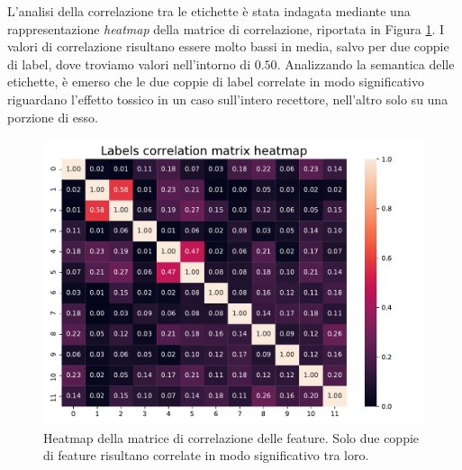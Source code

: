L'analisi della correlazione tra le etichette è stata indagata mediante una rappresentazione \textit{heatmap} della matrice di correlazione, riportata in Figura \ref{fig:labelscorrmatrixheatmap}. I valori di correlazione risultano essere molto bassi in media, salvo per due coppie di label, dove troviamo valori nell'intorno di $0.50$. Analizzando la semantica delle etichette, è emerso che le due coppie di label correlate in modo significativo riguardano l'effetto tossico in un caso sull'intero recettore, nell'altro solo su una porzione di esso.
\begin{figure}
	\centering
	\includegraphics[width=0.7\linewidth]{../images/pdf/labels_corr_matrix_heatmap}
	\caption{Heatmap della matrice di correlazione delle feature. Solo due coppie di feature risultano correlate in modo significativo tra loro.}
	\label{fig:labelscorrmatrixheatmap}
\end{figure}

